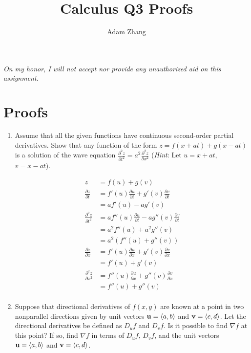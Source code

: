 \documentclass[11pt]{article}
\title{Calculus Q3 Proofs}
\author{Adam Zhang}
\renewcommand{\vec}[1]{\ensuremath\mathbf{#1}}
\begin{document}
\pagestyle{fancy}

\begin{center}
  \emph{On my honor, I will not accept nor provide any unauthorized aid on this assignment.}
\end{center}

\section*{Proofs}
\begin{enumerate}
\item Assume that all the given functions have continuous second-order partial
  derivatives. Show that any function of the form \(z = f(x + at) + g(x - at) \)
  is a solution of the wave equation \(\frac{\partial^2 z}{\partial t^2} = a^2
  \frac{\partial^2 z}{\partial x^2}\) (\textit{Hint}: Let \( u = x + at \), \( v
  = x - at \)).

  \begin{align*}
    z &= f(u) + g(v) \\
    \frac{\partial z}{\partial t}
      &= f'(u) \frac{\partial u}{\partial t} + g'(v) \frac{\partial
        v}{\partial t} \\
      &= a f'(u) -a g'(v) \\
    \frac{\partial^2 z}{\partial t^2}
      &= a f''(u) \frac{\partial u}{\partial t} - a g''(v) \frac{\partial
        v}{\partial t} \\
      &= a^2 f''(u) + a^2 g''(v) \\
      &= a^2 (f''(u) + g''(v)) \\
    \frac{\partial z}{\partial x}
    &= f'(u) \frac{\partial u}{\partial x} + g'(v) \frac{\partial v}{\partial x}
    \\
      &= f'(u) + g'(v) \\
    \frac{\partial^2 z}{\partial x^2}
    &= f''(u) \frac{\partial u}{\partial x} + g''(v) \frac{\partial v}{\partial x} \\
    &= f''(u) + g''(v) \\
  \end{align*}

\item Suppose that directional derivatives of \(f(x,y)\) are known at a point in two nonparallel directions given by unit vectors \(\vec{u} = \langle a, b \rangle\) and \(\vec{v} = \langle c, d \rangle\). Let the directional derivatives be defined as \(D_{u} f\) and \(D_{v} f\). Is it possible to find \( \nabla f \) at this point? If so, find \( \nabla f \) in terms of \( D_{u} f \), \( D_{v} f \), and the unit vectors \(\vec{u} = \langle a, b \rangle\) and \(\vec{v} = \langle c, d \rangle\).


\end{enumerate}
\end{document}
